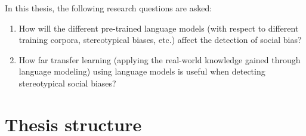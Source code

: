 In this thesis, the following research questions are asked:
\begin{enumerate}
    \item How will the different pre-trained language models (with respect to different training corpora, stereotypical biases, etc.) affect the detection of social bias?
    \item How far transfer learning (applying the real-world knowledge gained through language modeling) using language models is useful when detecting stereotypical social biases?
\end{enumerate}

\section{Thesis structure}

